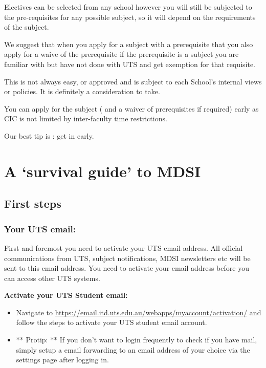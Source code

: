 \documentclass[]{book}
\providecommand{\tightlist}{%
  \setlength{\itemsep}{0pt}\setlength{\parskip}{0pt}}
\theoremstyle{definition}
\theoremstyle{definition}
\theoremstyle{remark}
\begin{document}
Electives can be selected from any school however you will still be
subjected to the pre-requisites for any possible subject, so it will
depend on the requirements of the subject.

We suggest that when you apply for a subject with a prerequisite that
you also apply for a waive of the prerequisite if the prerequisite is a
subject you are familiar with but have not done with UTS and get
exemption for that requisite.

This is not always easy, or approved and is subject to each School's
internal views or policies. It is definitely a consideration to take.

You can apply for the subject ( and a waiver of prerequisites if
required) early as CIC is not limited by inter-faculty time
restrictions.

Our best tip is : get in early.

\chapter{\texorpdfstring{A `survival guide' to
MDSI}{A survival guide to MDSI}}\label{a-survival-guide-to-mdsi}

\section{First steps}\label{first-steps}

\subsection{Your UTS email:}\label{your-uts-email}

First and foremost you need to activate your UTS email address. All
official communications from UTS, subject notifications, MDSI
newsletters etc will be sent to this email address. You need to activate
your email address before you can access other UTS systems.

\textbf{Activate your UTS Student email:}

\begin{itemize}
\tightlist
\item
  Navigate to
  \url{https://email.itd.uts.edu.au/webapps/myaccount/activation/} and
  follow the steps to activate your UTS student email account.
\item
  ** Protip: ** If you don't want to login frequently to check if you
  have mail, simply setup a email forwarding to an email address of your
  choice via the settings page after logging in.
\end{itemize}
\end{document}
